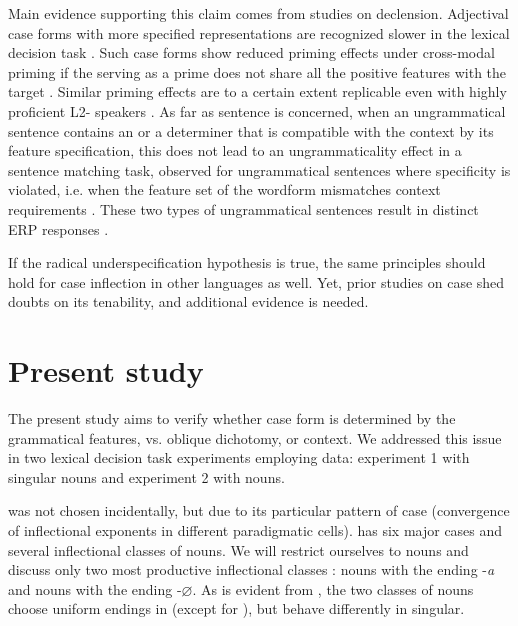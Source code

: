 \documentclass[output=paper, modfonts,newtxmath,hidelinks]{langscibook}
\begin{document}
Main evidence supporting this claim comes from studies on   declension. Adjectival case forms with more specified representations are recognized slower in the lexical decision task \citep{clahsen2001mental}. Such case forms show reduced priming effects under cross-modal priming if the  serving as a prime does not share all the positive features with the target \citep{clahsen2001mental}. Similar priming effects are to a certain extent replicable even with highly proficient L2- speakers \citep{bosch2016accessing, bosch2017time}. As far as sentence  is concerned, when an ungrammatical sentence contains an  or a determiner that is compatible with the context by its feature specification, this does not lead to an ungrammaticality effect in a sentence matching task, observed for ungrammatical sentences where specificity is violated, i.e. when the feature set of the wordform mismatches context requirements \citep{penke2004psycholinguistic}. These two types of ungrammatical sentences result in distinct ERP responses \citep{opitz2013neurophysiological}. 

If the radical underspecification hypothesis is true, the same principles should hold for  case inflection in other languages as well. Yet, prior studies on case  shed doubts on its tenability, and additional evidence is needed.

\section{Present study}\label{sec:2}
The present study aims to verify whether case form  is determined by the grammatical features,  vs. oblique dichotomy, or context. We addressed this issue in two lexical decision task experiments employing  data: experiment 1 with singular nouns and experiment 2 with  nouns.

 was not chosen incidentally, but due to its particular pattern of case  (convergence of inflectional exponents in different paradigmatic cells).  has six major cases and several inflectional classes of nouns. We will restrict ourselves to  nouns and discuss only two most productive inflectional classes \citep{wiese2004categories}:  nouns with the  ending -\textit{a} and  nouns with the   ending -$\varnothing$. As is evident from , the two classes of nouns choose uniform endings in  (except for ), but behave differently in singular.
\end{document}
